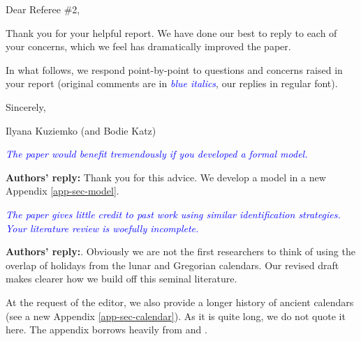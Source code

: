 \documentclass[12pt]{article}
\begin{document}
\begin{refsection}

\lhead{}


\noindent Dear Referee \#2,

Thank you for your helpful report.  We have done our best to reply to each of your concerns, which we feel has dramatically improved the paper.





In what follows, we respond point-by-point to questions and concerns raised in your report (original comments are in \textcolor{blue}{\textit{blue italics}}, our replies in regular font).

\medskip \noindent
Sincerely,

\medskip \noindent
Ilyana Kuziemko (and Bodie Katz)


\newpage \clearpage

\textcolor{blue}{\textit{The paper would benefit tremendously if you developed a formal model.}}

\medskip

\vspace{.5cm}
\textbf{Authors' reply:} Thank you for this advice.  We develop a model in a new Appendix \ref{app-sec-model}.  

\medskip

\textcolor{blue}{\textit{The paper gives little credit to past work using similar identification strategies.  Your literature review is woefully incomplete.}}

\medskip

\vspace{.5cm}
\textbf{Authors' reply:}. Obviously we are not the first researchers to think of using the overlap of holidays from the lunar and Gregorian calendars.  Our revised draft makes clearer how we build off this seminal literature.

At the request of the editor, we also provide a longer history of ancient calendars (see a new Appendix \ref{app-sec-calendar}).  As it is quite long, we do not quote it here.  The appendix borrows heavily from \citet{depuydt1997civil} and \citet{mckay2016coligny}.  


\bigskip

\printbibliography
\end{refsection}
\end{document}
